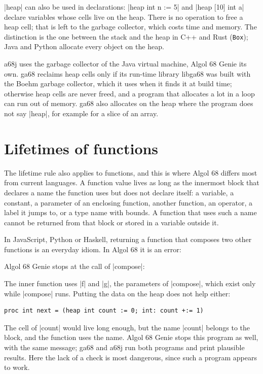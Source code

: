 \code|heap| can also be used in declarations: \code|heap int n := 5| and
\code|heap [10] int a| declare variables whose cells live on the heap.
There is no operation to free a heap cell; that is left to the garbage
collector, which costs time and memory. The distinction is the one
between the stack and the heap in C++ and Rust (\texttt{Box}); Java and
Python allocate every object on the heap.

\begin{implnote}
a68j uses the garbage collector of the Java virtual machine, Algol 68
Genie its own. ga68 reclaims heap cells only if its run-time library
libga68 was built with the Boehm garbage collector, which it uses when it
finds it at build time; otherwise heap cells are never freed, and a
program that allocates a lot in a loop can run out of memory. ga68 also
allocates on the heap where the program does not say \code|heap|, for
example for a slice of an array.
\end{implnote}

\section{Lifetimes of functions}\label{sec-proc-lifetimes}

The lifetime rule also applies to functions, and this is where Algol 68
differs most from current languages. A function value lives as long as
the innermost block that declares a name the function uses but does not
declare itself: a variable, a constant, a parameter of an enclosing
function, another function, an operator, a label it jumps to, or a type
name with bounds. A function that uses such a
name cannot be returned from that block or stored in a variable outside
it.

In JavaScript, Python or Haskell, returning a function that composes two
other functions is an everyday idiom. In Algol 68 it is an error:


\noindent Algol 68 Genie stops at the call of \code|compose|:

The inner function uses \code|f| and \code|g|, the parameters of
\code|compose|, which exist only while \code|compose| runs. Putting the
data on the heap does not help either:
\begin{lstlisting}
proc int next = (heap int count := 0; int: count +:= 1)
\end{lstlisting}
The cell of \code|count| would live long enough, but the name
\code|count| belongs to the block, and the function uses the name. Algol
68 Genie stops this program as well, with the same message; ga68 and a68j
run both programs and print plausible results. Here the lack of a check
is most dangerous, since such a program appears to work.

